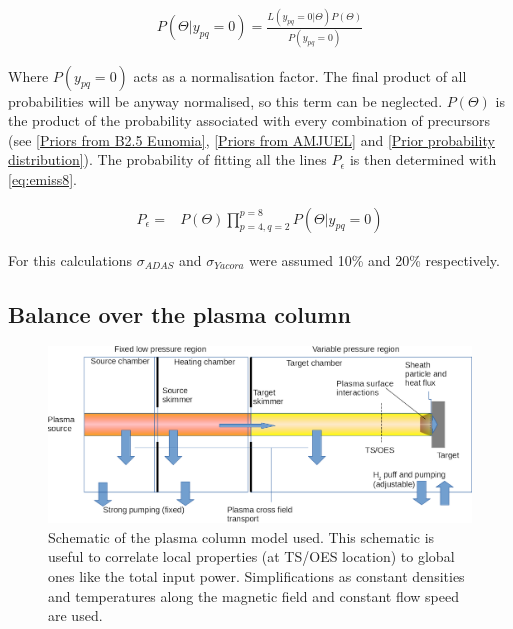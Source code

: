 \begin{equation}
\label{eq:emiss8b}
\begin{aligned}
P(\Theta|y_{pq} = 0) = \frac{L(y_{pq} = 0|\Theta) P(\Theta)}{P(y_{pq} = 0)}
\end{aligned}
\end{equation}

Where $P(y_{pq} = 0)$ acts as a normalisation factor. The final product of all probabilities will be anyway normalised, so this term can be neglected. $P(\Theta)$ is  the product of the probability associated with every combination of precursors (see \autoref{Priors from B2.5 Eunomia}, \ref{Priors from AMJUEL} and \ref{Prior probability distribution}). The probability of fitting all the lines $P_{\epsilon}$ is then determined with \autoref{eq:emiss8}.

\begin{equation}
\label{eq:emiss8}
\begin{aligned}
P_{\epsilon} =& P(\Theta) \prod_{p=4,q=2}^{p=8} P(\Theta|y_{pq} = 0)
\end{aligned}
\end{equation}

For this calculations $\sigma_{ADAS}$ and $\sigma_{Yacora}$ were assumed 10\% and 20\% respectively.

\subsection{Balance over the plasma column}\label{Balance over the plasma column}

\begin{figure}
	\centering
	\includegraphics[width=\linewidth,trim={0 0 0 0},clip]{Chapters/chapter3/figs/plasma_column2.png}
	\caption{Schematic of the plasma column model used. This schematic is useful to correlate local properties (at TS/OES location) to global ones like the total input power. Simplifications as constant densities and temperatures along the magnetic field and constant flow speed are used.}
	\label{fig:plasma_column1}
\end{figure}

